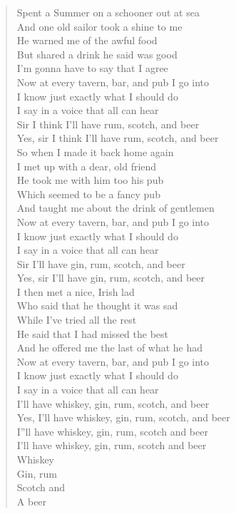 \documentclass[11pt]{article}
\begin{document}
\begin{verse}
\vspace*{1em}
Spent a Summer on a schooner out at sea\\
And one old sailor took a shine to me\\
He warned me of the awful food\\
But shared a drink he said was good\\
I'm gonna have to say that I agree\\
\vspace*{1em}
Now at every tavern, bar, and pub I go into\\
I know just exactly what I should do\\
I say in a voice that all can hear\\
Sir I think I'll have rum, scotch, and beer\\
Yes, sir I think I'll have rum, scotch, and beer\\
\vspace*{1em}
So when I made it back home again\\
I met up with a dear, old friend\\
He took me with him too his pub\\
Which seemed to be a fancy pub\\
And taught me about the drink of gentlemen\\
\vspace*{1em}
Now at every tavern, bar, and pub I go into\\
I know just exactly what I should do\\
I say in a voice that all can hear\\
Sir I'll have gin, rum, scotch, and beer\\
Yes, sir I'll have gin, rum, scotch, and beer\\
\vspace*{1em}
I then met a nice, Irish lad\\
Who said that he thought it was sad\\
While I've tried all the rest\\
He said that I had missed the best\\
And he offered me the last of what he had\\
\vspace*{1em}
Now at every tavern, bar, and pub I go into\\
I know just exactly what I should do\\
I say in a voice that all can hear\\
I'll have whiskey, gin, rum, scotch, and beer\\
Yes, I'll have whiskey, gin, rum, scotch, and beer\\
I''ll have whiskey, gin, rum, scotch and beer\\
I'll have whiskey, gin, rum, scotch and beer\\
\vspace*{1em}
Whiskey\\
Gin, rum\\
Scotch and\\
A beer\\
\end{verse}
\clearpage
\end{document}
